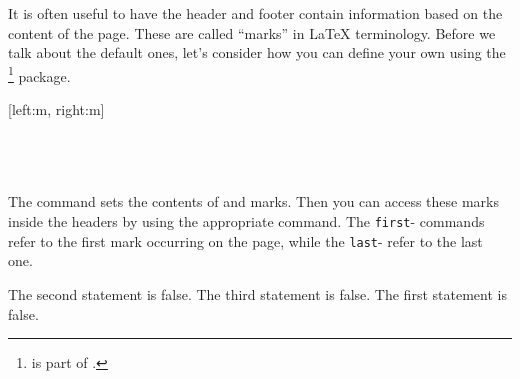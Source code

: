 It is often useful to have the header and footer contain information based on
the content of the page. These are called \enquote{marks} in \LaTeX{}
terminology. Before we talk about the default ones, let's consider how you can
define your own using the \footnote{ is part
  of .} package.
\begin{lscommand}
  [left:m, right:m] \\
   \\
   \\
   \\
\end{lscommand}
The  command sets the contents of  and 
marks. Then you can access these marks inside the headers by using the appropriate
command. The \texttt{first}- commands refer to the first mark occurring on the
page, while the \texttt{last}- refer to the last one.
\begin{example}[standalone, paperheight=4cm]
\geometry{includehead, includefoot, headsep=.5em, footskip=1em} %
\sloppy %
\usepackage{fancyhdr}%
\usepackage{extramarks}
\pagestyle{fancy}%

\fancyhead[L]{\firstleftxmark}
\fancyhead[R]{\lastleftxmark}
\fancyfoot[L]{\firstrightxmark}
\fancyfoot[R]{\lastrightxmark}

\noindent %
The second statement is false.
The third statement is false.
The first statement is false.
\end{example}

